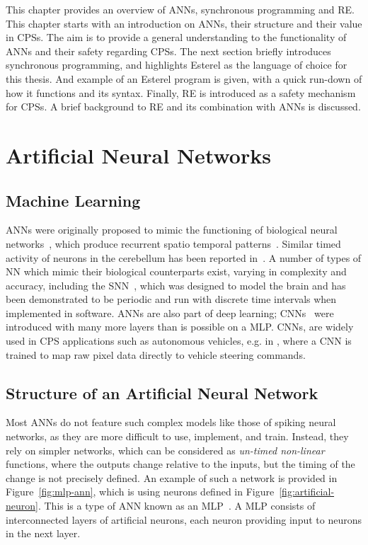 This chapter provides an overview of \acfp{ANN}, synchronous programming and \acf{RE}.
This chapter starts with an introduction on \acp{ANN}, their structure and their value in \acp{CPS}.
The aim is to provide a general understanding to the functionality of \acp{ANN} and their safety regarding \acp{CPS}.
The next section briefly introduces synchronous programming, and highlights Esterel as the language of choice for this thesis. 
And example of an Esterel program is given, with a quick run-down of how it functions and its syntax.
Finally, \ac{RE} is introduced as a safety mechanism for \acp{CPS}.
A brief background to \ac{RE} and its combination with \acp{ANN} is discussed.

\section{Artificial Neural Networks}
\subsection{Machine Learning}
\acp{ANN} were originally proposed to mimic the functioning of  biological neural networks~\cite{kohonen1988introduction}, which produce recurrent spatio temporal patterns~\cite{rolston2007precisely}. 
Similar timed activity of neurons in the cerebellum has been reported in~\cite{bullock1994neural, moore1989adaptively}. 
A number of types of \ac{NN} which mimic their biological counterparts exist, varying in complexity and accuracy, including the \ac{SNN}~\cite{izhikevich2003spiking,maass1997spiking}, which was designed to model the brain and has been demonstrated to be periodic and run with discrete time intervals when implemented in software. 
\acp{ANN} are also part of deep learning; \acfp{CNN}~\cite{schmidhuber2015deep} were introduced with many more layers than is possible on a \ac{MLP}. 
\acp{CNN}, are widely used in \ac{CPS} applications such as autonomous vehicles, e.g. in \cite{EndToEndLearningForSelfDrivingCars}, where a \ac{CNN} is trained to map raw pixel data directly to vehicle steering commands.

\subsection{Structure of an Artificial Neural Network}
Most \acp{ANN} do not feature such complex models like those of spiking neural networks, as they are more difficult to use, implement, and train. 
Instead, they rely on simpler networks, which can be considered as \emph{un-timed non-linear} functions, where the outputs change relative to the inputs, but the timing of the change is not precisely defined. 
An example of such a network is provided in Figure~\ref{fig:mlp-ann}, which is using neurons defined in Figure~\ref{fig:artificial-neuron}. 
This is a type of \ac{ANN} known as an \acf{MLP}~\cite{yegnanarayana1994artificial}.
A \ac{MLP} consists of interconnected layers of artificial neurons, each neuron providing input to neurons in the next layer.


